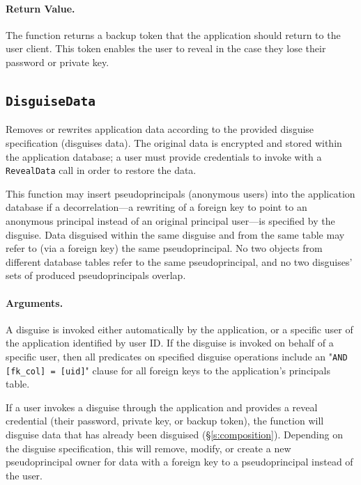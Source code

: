     \paragraph{Return Value.} 
    The function returns a backup token that the application should return to
    the user client. This token enables the user to reveal in the case they lose
    their password or private key.


\subsection{\texttt{DisguiseData}}

    Removes or rewrites application data according to the provided disguise
    specification (\ie disguises data). The original data is encrypted and
    stored within the application database; a user must provide credentials to
    invoke with a \texttt{RevealData} call in order to restore the data.
    
    This function may insert pseudoprincipals (anonymous users) into the
    application database if a decorrelation---a rewriting of a foreign key to
    point to an anonymous principal instead of an original principal user---is
    specified by the disguise.  Data disguised within the same disguise and from
    the same table may refer to (via a foreign key) the same pseudoprincipal.
    No two objects from different database tables refer to the same
    pseudoprincipal, and no two disguises' sets of produced pseudoprincipals overlap.

    \paragraph{Arguments.} 
    A disguise is invoked either automatically by the application, or a specific
    user of the application identified by user ID. 
    If the disguise is invoked on behalf of a specific user, then all predicates
    on specified disguise operations include an "\texttt{AND [fk\_col] = [uid]}"
    clause for all foreign keys to the application's principals table.

    If a user invokes a disguise through the application and provides a reveal
    credential (their password, private key, or backup token), the function will
    disguise data that has already been disguised (\S\ref{s:composition}).
    Depending on the disguise specification, this will remove, modify, or create
    a new pseudoprincipal owner for data with a foreign key to a pseudoprincipal
    instead of the user.


